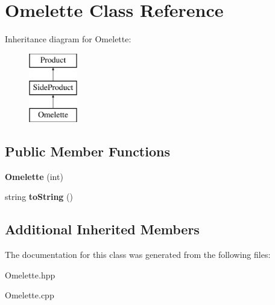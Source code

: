 \hypertarget{class_omelette}{}\section{Omelette Class Reference}
\label{class_omelette}
Inheritance diagram for Omelette\+:\begin{figure}[H]
\begin{center}
\leavevmode
\includegraphics[height=3.000000cm]{class_omelette}
\end{center}
\end{figure}
\subsection*{Public Member Functions}
\begin{DoxyCompactItemize}
\item 
\mbox{\label{class_omelette_a3202e000c3e4ac83768f977f5c0197d7}} 
{\bfseries Omelette} (int)
\item 
\mbox{\label{class_omelette_a58a9f2ec256a7f501ee8011b03451060}} 
string {\bfseries to\+String} ()
\end{DoxyCompactItemize}
\subsection*{Additional Inherited Members}


The documentation for this class was generated from the following files\+:\begin{DoxyCompactItemize}
\item 
Omelette.\+hpp\item 
Omelette.\+cpp\end{DoxyCompactItemize}
